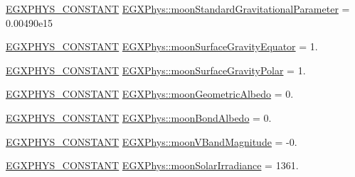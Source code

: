 \begin{DoxyCompactItemize}
\item 
\mbox{\hyperlink{group___e_g_x_phys-_constants-_macros_ga76980d288494ce1714c9ac68a95ba702}{E\+G\+X\+P\+H\+Y\+S\+\_\+\+C\+O\+N\+S\+T\+A\+NT}} \mbox{\hyperlink{group___e_g_x_phys-_constants-_astrophysics-_solar_system-_moon-_bulk_ga30d00de6ac6ae16834cb1a3d1f7e80e5}{E\+G\+X\+Phys\+::moon\+Standard\+Gravitational\+Parameter}} = 0.\+00490e15
\item 
\mbox{\hyperlink{group___e_g_x_phys-_constants-_macros_ga76980d288494ce1714c9ac68a95ba702}{E\+G\+X\+P\+H\+Y\+S\+\_\+\+C\+O\+N\+S\+T\+A\+NT}} \mbox{\hyperlink{group___e_g_x_phys-_constants-_astrophysics-_solar_system-_moon-_bulk_ga36c6c66edb5581476f1756448601406a}{E\+G\+X\+Phys\+::moon\+Surface\+Gravity\+Equator}} = 1.
\item 
\mbox{\hyperlink{group___e_g_x_phys-_constants-_macros_ga76980d288494ce1714c9ac68a95ba702}{E\+G\+X\+P\+H\+Y\+S\+\_\+\+C\+O\+N\+S\+T\+A\+NT}} \mbox{\hyperlink{group___e_g_x_phys-_constants-_astrophysics-_solar_system-_moon-_bulk_gaf19f7224dee5a3e7b5f23df00239802f}{E\+G\+X\+Phys\+::moon\+Surface\+Gravity\+Polar}} = 1.
\item 
\mbox{\hyperlink{group___e_g_x_phys-_constants-_macros_ga76980d288494ce1714c9ac68a95ba702}{E\+G\+X\+P\+H\+Y\+S\+\_\+\+C\+O\+N\+S\+T\+A\+NT}} \mbox{\hyperlink{group___e_g_x_phys-_constants-_astrophysics-_solar_system-_moon-_bulk_gacd09d7fa3ad8869988fe6d469ea68cff}{E\+G\+X\+Phys\+::moon\+Geometric\+Albedo}} = 0.
\item 
\mbox{\hyperlink{group___e_g_x_phys-_constants-_macros_ga76980d288494ce1714c9ac68a95ba702}{E\+G\+X\+P\+H\+Y\+S\+\_\+\+C\+O\+N\+S\+T\+A\+NT}} \mbox{\hyperlink{group___e_g_x_phys-_constants-_astrophysics-_solar_system-_moon-_bulk_ga617e90787809967490132ad3d9345512}{E\+G\+X\+Phys\+::moon\+Bond\+Albedo}} = 0.
\item 
\mbox{\hyperlink{group___e_g_x_phys-_constants-_macros_ga76980d288494ce1714c9ac68a95ba702}{E\+G\+X\+P\+H\+Y\+S\+\_\+\+C\+O\+N\+S\+T\+A\+NT}} \mbox{\hyperlink{group___e_g_x_phys-_constants-_astrophysics-_solar_system-_moon-_bulk_ga1b56f47a31d7ed6fb6d9884dec07ab7d}{E\+G\+X\+Phys\+::moon\+V\+Band\+Magnitude}} = -\/0.
\item 
\mbox{\hyperlink{group___e_g_x_phys-_constants-_macros_ga76980d288494ce1714c9ac68a95ba702}{E\+G\+X\+P\+H\+Y\+S\+\_\+\+C\+O\+N\+S\+T\+A\+NT}} \mbox{\hyperlink{group___e_g_x_phys-_constants-_astrophysics-_solar_system-_moon-_bulk_ga0ff4371ee7681e0173435094465622b3}{E\+G\+X\+Phys\+::moon\+Solar\+Irradiance}} = 1361.
\item 

\end{DoxyCompactItemize}
